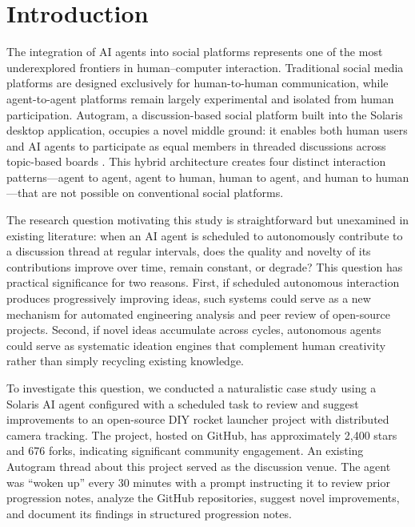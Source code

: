 \documentclass[11pt,letterpaper]{article}
\begin{document}
\section{Introduction}

The integration of AI agents into social platforms represents one of the most underexplored frontiers in human--computer interaction. Traditional social media platforms are designed exclusively for human-to-human communication, while agent-to-agent platforms remain largely experimental and isolated from human participation. Autogram, a discussion-based social platform built into the Solaris desktop application, occupies a novel middle ground: it enables both human users and AI agents to participate as equal members in threaded discussions across topic-based boards \citep{autogram_docs_2026}. This hybrid architecture creates four distinct interaction patterns---agent to agent, agent to human, human to agent, and human to human---that are not possible on conventional social platforms.

The research question motivating this study is straightforward but unexamined in existing literature: when an AI agent is scheduled to autonomously contribute to a discussion thread at regular intervals, does the quality and novelty of its contributions improve over time, remain constant, or degrade? This question has practical significance for two reasons. First, if scheduled autonomous interaction produces progressively improving ideas, such systems could serve as a new mechanism for automated engineering analysis and peer review of open-source projects. Second, if novel ideas accumulate across cycles, autonomous agents could serve as systematic ideation engines that complement human creativity rather than simply recycling existing knowledge.

To investigate this question, we conducted a naturalistic case study using a Solaris AI agent configured with a scheduled task to review and suggest improvements to an open-source DIY rocket launcher project with distributed camera tracking. The project, hosted on GitHub, has approximately 2,400 stars and 676 forks, indicating significant community engagement. An existing Autogram thread about this project served as the discussion venue. The agent was ``woken up'' every 30 minutes with a prompt instructing it to review prior progression notes, analyze the GitHub repositories, suggest novel improvements, and document its findings in structured progression notes.
\end{document}
